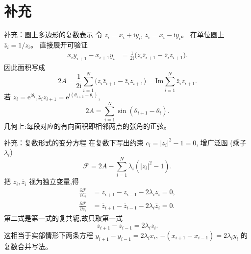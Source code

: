 \documentclass[fontset=windows, chinese, 10pt, xcolor=dvipsnames]{beamer}
\begin{document}
\appendix
\section{补充}

\begin{frame}{补充：圆上多边形的复数表示}
  令 $z_i = x_i + \mathrm{i} y_i$, $\bar z_i = x_i - \mathrm{i} y_i$。
  在单位圆上 $\bar z_i = 1/z_i$。
  \vspace{0.2em}
  直接展开可验证
  \begin{align*}
    x_i y_{i+1} - x_{i+1} y_i
    &= \tfrac{1}{2\mathrm{i}}\bigl(z_i \bar z_{i+1} - \bar z_i z_{i+1}\bigr).
  \end{align*}
  因此面积写成
  \begin{equation*}
    \boxed{2A = \frac{1}{2\mathrm{i}}\sum_{i=1}^{N}
          \bigl(z_i \bar z_{i+1} - \bar z_i z_{i+1}\bigr)
        = \text{Im}\sum_{i=1}^{N}\bar z_i z_{i+1}.}
  \end{equation*}
  若 $z_i = \mathrm{e}^{\mathrm{i}\theta_i}$,$\bar z_i z_{i+1} = \mathrm{e}^{\mathrm{i}(\theta_{i+1}-\theta_i)}$,
  \begin{equation*}
    2A = \sum_{i=1}^{N}\sin(\theta_{i+1}-\theta_i).
  \end{equation*}
  几何上:每段对应的有向面积即相邻两点的张角的正弦。
\end{frame}

\begin{frame}{补充：复数形式的变分方程}
  在复数下写出约束 $c_i=|z_i|^2-1=0$,
  增广泛函 (乘子 $\lambda_i$)
  \begin{equation*}
    \mathcal{F}=2A-\sum_{i=1}^{N}\lambda_i(|z_i|^2-1).
  \end{equation*}
  把 $z_i,\bar z_i$ 视为独立变量,得
  \begin{align*}
    \frac{\partial\mathcal{F}}{\partial \bar z_i}
    &= z_{i+1}-z_{i-1} - 2\lambda_i z_i = 0,\\
    \frac{\partial\mathcal{F}}{\partial z_i}
    &= \bar z_{i+1}-\bar z_{i-1} - 2\lambda_i \bar z_i = 0.
  \end{align*}
  第二式是第一式的复共轭,故只取第一式
  \begin{equation*}
    \boxed{z_{i+1}-z_{i-1} = 2\lambda_i z_i.}
  \end{equation*}
  这相当于实部情形下两条方程 $y_{i+1}-y_{i-1}=2\lambda_i x_i$,
  $-(x_{i+1}-x_{i-1})=2\lambda_i y_i$ 的复数合并写法。
\end{frame}
\end{document}
